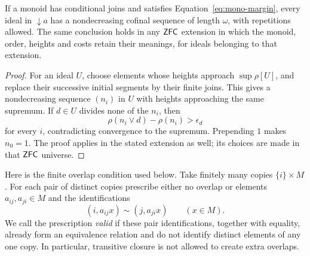 \begin{lemma}\label{lem:mono-countable-ideal}
If a monoid has conditional joins and satisfies
Equation~\eqref{eq:mono-margin}, every ideal in $\downarrow a$ has a
nondecreasing cofinal sequence of length $\omega$, with repetitions
allowed.  The same conclusion holds in any $\mathsf{ZFC}$ extension in which
the monoid, order, heights and costs retain their meanings, for ideals
belonging to that extension.
\end{lemma}
\begin{proof}
For an ideal $U$, choose elements whose heights approach
$\sup\rho[U]$, and replace their successive initial segments by their
finite joins.  This gives a nondecreasing sequence $(n_i)$ in $U$
with heights approaching the same supremum.  If $d\in U$ divides
none of the $n_i$, then
\[
 \rho(n_i\vee d)-\rho(n_i)>\epsilon_d
\]
for every $i$, contradicting convergence to the supremum.  Prepending
$1$ makes $n_0=1$.  The proof applies in the stated extension as well;
its choices are made in that $\mathsf{ZFC}$ universe.
\end{proof}

Here is the finite overlap condition used below.  Take finitely many
copies $\{i\}\times M$.  For each pair of distinct copies prescribe
either no overlap or elements $a_{ij},a_{ji}\in M$ and the
identifications
\[
 (i,a_{ij}x)\sim(j,a_{ji}x)\qquad(x\in M).
\]
We call the prescription \emph{valid} if these pair identifications,
together with equality, already form an equivalence relation and do
not identify distinct elements of any one copy.  In particular,
transitive closure is not allowed to create extra overlaps.

